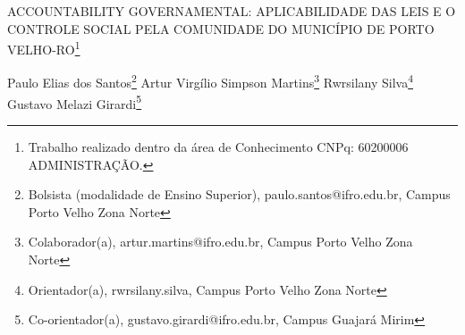 \documentclass[article,12pt,onesidea,4paper,english,brazil]{abntex2}
\begin{document}
	
	
	\frenchspacing 
	
	\begin{center}
		\LARGE ACCOUNTABILITY GOVERNAMENTAL: APLICABILIDADE DAS LEIS E O CONTROLE SOCIAL PELA COMUNIDADE DO MUNICÍPIO DE PORTO VELHO-RO\footnote{Trabalho realizado dentro da área de Conhecimento CNPq: 60200006 ADMINISTRAÇÃO.}
		
		\normalsize
		Paulo Elias dos Santos\footnote{Bolsista (modalidade de Ensino Superior), paulo.santos@ifro.edu.br, Campus Porto Velho Zona Norte} 
		Artur Virgílio Simpson Martins\footnote{Colaborador(a), artur.martins@ifro.edu.br, Campus Porto Velho Zona Norte} 
		Rwrsilany Silva\footnote{Orientador(a), rwrsilany.silva, Campus Porto Velho Zona Norte} 
		Gustavo Melazi Girardi\footnote{Co-orientador(a), gustavo.girardi@ifro.edu.br, Campus Guajará Mirim} 
	\end{center}
	
\end{document}
